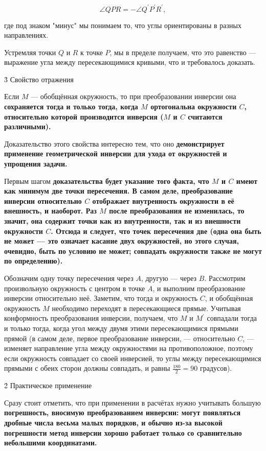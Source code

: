 $$ \angle QPR = - \angle Q^\prime P^\prime R^\prime, $$

где под знаком "минус" мы понимаем то, что углы ориентированы в разных направлениях.

Устремляя точки $Q$ и $R$ к точке $P$, мы в пределе получаем, что это равенство --- выражение угла между пересекающимися кривыми, что и требовалось доказать.


\h3{ Свойство отражения }

Если $M$ --- обобщённая окружность, то при преобразовании инверсии она \bf{сохраняется} тогда и только тогда, когда $M$ \bf{ортогональна} окружности $C$, относительно которой производится инверсия ($M$ и $C$ считаются различными).

Доказательство этого свойства интересно тем, что оно \bf{демонстрирует} применение геометрической инверсии для ухода от окружностей и упрощения задачи.

Первым шагом \bf{доказательства} будет указание того факта, что $M$ и $C$ имеют как минимум две точки пересечения. В самом деле, преобразование инверсии относительно $C$ отображает внутренность окружности в её внешность, и наоборот. Раз $M$ после преобразования не изменилась, то значит, она содержит точки как из внутренности, так и из внешности окружности $C$. Отсюда и следует, что точек пересечения две (одна она быть не может --- это означает касание двух окружностей, но этого случая, очевидно, быть по условию не может; совпадать окружности также не могут по определению).

Обозначим одну точку пересечения через $A$, другую --- через $B$. Рассмотрим произвольную окружность с центром в точке $A$, и выполним преобразование инверсии относительно неё. Заметим, что тогда и окружность $C$, и обобщённая окружность $M$ необходимо переходят в пересекающиеся прямые. Учитывая конформность преобразования инверсии, получаем, что $M$ и $M^\prime$ совпадали тогда и только тогда, когда угол между двумя этими пересекающимися прямыми прямой (в самом деле, первое преобразование инверсии, --- относительно $C$, --- изменяет направление угла между окружностями на противоположное, поэтому если окружность совпадает со своей инверсией, то углы между пересекающимися прямыми с обеих сторон должны совпадать, и равны $\frac{ 180 }{ 2 } = 90$ градусов).


\h2{ Практическое применение }

Сразу стоит отметить, что при применении в расчётах нужно учитывать большую \bf{погрешность}, вносимую преобразованием инверсии: могут появляться дробные числа весьма малых порядков, и обычно из-за высокой погрешности метод инверсии хорошо работает только со сравнительно небольшими координатами.


